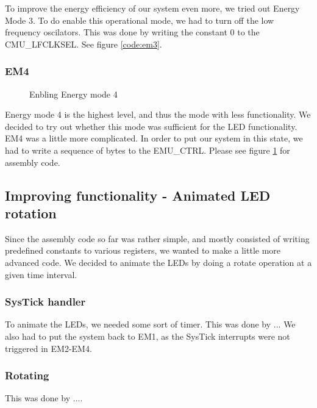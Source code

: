 		To improve the energy efficiency of our system even more, we tried out Energy Mode 3. To do enable this operational mode, we had to turn off the low frequency oscilators. This was done by writing the constant $0$ to the CMU\_LFCLKSEL. See figure \ref{code:em3}.
	
		\subsubsection{EM4}
		\label{subsubsection:em4}
	
		\begin{figure}[t]
			
			\caption{Enbling Energy mode 4}
			\label{code:em4}
		\end{figure}

		Energy mode 4 is the highest level, and thus the mode with less functionality. We decided to try out whether this mode was sufficient for the LED functionality. EM4 was a little more complicated. In order to put our system in this state, we had to write a sequence of bytes to the EMU\_CTRL. Please see figure \ref{code:em4} for assembly code.

	
	\subsection{Improving functionality - Animated LED rotation}
	Since the assembly code so far was rather simple, and mostly consisted of writing predefined constants to various registers, we wanted to make a little more advanced code. We decided to animate the LEDs by doing a rotate operation at a given time interval.

	\subsubsection{SysTick handler}
	To animate the LEDs, we needed some sort of timer. This was done by ... We also had to put the system back to EM1, as the SysTick interrupts were not triggered in EM2-EM4.

	\subsubsection{Rotating}
	This was done by ....

